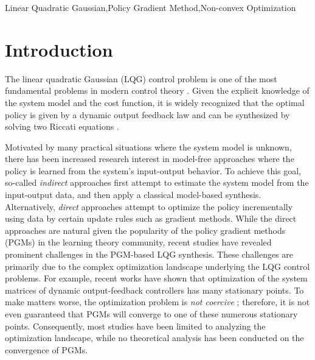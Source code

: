 \documentclass[preprint,5p,times,twocolumn]{elsarticle}
\begin{document}
\begin{frontmatter}
%



\begin{keyword}
Linear Quadratic Gaussian\sep Policy Gradient Method\sep Non-convex Optimization
\end{keyword}

\end{frontmatter}



\section{Introduction}
The linear quadratic Gaussian (LQG) control problem is one of the most fundamental problems in modern control theory \cite{kalman1961new,athans1971role}. Given the explicit knowledge of the system model and the cost function, it is widely recognized that the optimal policy is given by a dynamic output feedback law and can be synthesized by solving two Riccati equations \cite{soderstrom2002discrete}.

Motivated by many practical situations where the system model is unknown, there has been increased research interest in model-free approaches where the policy is learned from the system's input-output behavior. 
To achieve this goal, so-called \emph{indirect} approaches first attempt to estimate the system model \cite{zheng2021sample2, boczar2018finite} from the input-output data, and then apply a classical model-based synthesis.
Alternatively,  \emph{direct} approaches attempt to optimize the policy incrementally using data by certain update rules such as gradient methods.
While the direct approaches are natural given the popularity of the policy gradient methods (PGMs) in the learning theory community, recent studies have revealed prominent challenges in the PGM-based LQG synthesis. 
These challenges are primarily due to the complex optimization landscape underlying the LQG control problems. 
For example, recent works \cite{tang2021analysis,duan2022optimization,hu2023toward} have shown that optimization of the system matrices of dynamic output-feedback controllers has many stationary points. To make matters worse, the optimization problem is {\it not coercive} \cite{hu2023toward}; therefore, it is not even guaranteed that PGMs will converge to one of these numerous stationary points. Consequently, most studies have been limited to analyzing the optimization landscape, while no theoretical analysis has been conducted on the convergence of PGMs.
\end{document}
